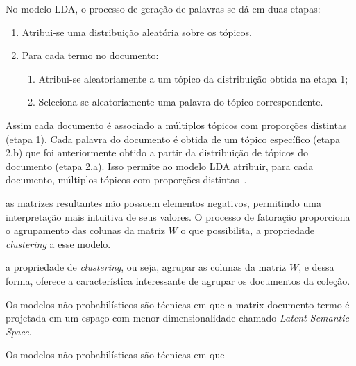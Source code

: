 No modelo LDA, o processo de geração de palavras se dá em duas etapas:

\begin{enumerate}
	\item Atribui-se uma distribuição aleatória sobre os tópicos.
	\item Para cada termo no documento:
		\begin{enumerate}
			\item Atribui-se aleatoriamente a um tópico da distribuição obtida na etapa 1;
			\item Seleciona-se aleatoriamente uma palavra do tópico correspondente.
		\end{enumerate}
\end{enumerate}

Assim cada documento é associado a múltiplos tópicos com proporções distintas (etapa 1). Cada palavra do documento é obtida de um tópico específico (etapa 2.b) que foi anteriormente obtido a partir da distribuição de tópicos do documento (etapa 2.a). Isso permite ao modelo LDA atribuir, para cada documento, múltiplos tópicos com proporções distintas~\cite{Blei2012}.


















as matrizes resultantes não possuem elementos negativos, permitindo uma interpretação mais intuitiva de seus valores. O processo de fatoração proporciona o agrupamento das colunas da matriz $W$ o que possibilita, a propriedade \textit{clustering} a esse modelo.


a propriedade de \textit{clustering}, ou seja, agrupar as colunas da matriz $W$, e dessa forma, oferece a característica interessante de agrupar os documentos da coleção.  %















Os modelos não-probabilísticos são técnicas em que a matrix documento-termo é projetada em um espaço com menor dimensionalidade chamado \textit{Latent Semantic Space}. 


Os modelos não-probabilísticas são técnicas em que 

